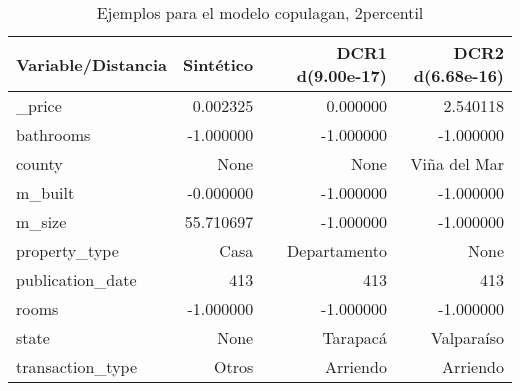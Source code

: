 \begin{table}[H]
\centering
\fontsize{10}{14}\selectfont
\caption{Ejemplos para el modelo copulagan, 2percentil}
\label{table-example-economicos-b-2-copulagan-2p}
\begin{tabular}{|l|r|r|r|}
\hline
\rowcolor[gray]{0.8}
Variable/Distancia & Sintético & DCR1 d(9.00e-17) & DCR2 d(6.68e-16) \\
\hline \_price & \cellcolor[rgb]{0.9, 0.54, 0.52} 0.002325 & \cellcolor[rgb]{0.9, 0.54, 0.52} 0.000000 & 2.540118 \\
\hline bathrooms & \cellcolor[rgb]{0.9, 0.54, 0.52} -1.000000 & \cellcolor[rgb]{0.9, 0.54, 0.52} -1.000000 & \cellcolor[rgb]{0.9, 0.54, 0.52} -1.000000 \\
\hline county & \cellcolor[rgb]{0.9, 0.54, 0.52} None & \cellcolor[rgb]{0.9, 0.54, 0.52} None & Viña del Mar \\
\hline m\_built & \cellcolor[rgb]{0.9, 0.54, 0.52} -0.000000 & \cellcolor[rgb]{0.9, 0.54, 0.52} -1.000000 & \cellcolor[rgb]{0.9, 0.54, 0.52} -1.000000 \\
\hline m\_size & \cellcolor[rgb]{0.9, 0.54, 0.52} 55.710697 & -1.000000 & -1.000000 \\
\hline property\_type & \cellcolor[rgb]{0.9, 0.54, 0.52} Casa & Departamento & None \\
\hline publication\_date & \cellcolor[rgb]{0.9, 0.54, 0.52} 413 & \cellcolor[rgb]{0.9, 0.54, 0.52} 413 & \cellcolor[rgb]{0.9, 0.54, 0.52} 413 \\
\hline rooms & \cellcolor[rgb]{0.9, 0.54, 0.52} -1.000000 & \cellcolor[rgb]{0.9, 0.54, 0.52} -1.000000 & \cellcolor[rgb]{0.9, 0.54, 0.52} -1.000000 \\
\hline state & \cellcolor[rgb]{0.9, 0.54, 0.52} None & Tarapacá & Valparaíso \\
\hline transaction\_type & \cellcolor[rgb]{0.9, 0.54, 0.52} Otros & Arriendo & Arriendo \\
\hline
\end{tabular}
\end{table}
